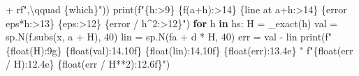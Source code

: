 \documentclass[
  letterpaper,
  DIV=11,
  numbers=noendperiod]{scrreprt}
\newenvironment{Shaded}{\begin{snugshade}}{\end{snugshade}}
\newcommand{\BuiltInTok}[1]{\textcolor[rgb]{0.00,0.23,0.31}{#1}}
\newcommand{\ControlFlowTok}[1]{\textcolor[rgb]{0.00,0.23,0.31}{\textbf{#1}}}
\newcommand{\DecValTok}[1]{\textcolor[rgb]{0.68,0.00,0.00}{#1}}
\newcommand{\ErrorTok}[1]{\textcolor[rgb]{0.68,0.00,0.00}{#1}}
\newcommand{\KeywordTok}[1]{\textcolor[rgb]{0.00,0.23,0.31}{\textbf{#1}}}
\newcommand{\NormalTok}[1]{\textcolor[rgb]{0.00,0.23,0.31}{#1}}
\newcommand{\OperatorTok}[1]{\textcolor[rgb]{0.37,0.37,0.37}{#1}}
\newcommand{\SpecialCharTok}[1]{\textcolor[rgb]{0.37,0.37,0.37}{#1}}
\newcommand{\SpecialStringTok}[1]{\textcolor[rgb]{0.13,0.47,0.30}{#1}}
\newcommand{\StringTok}[1]{\textcolor[rgb]{0.13,0.47,0.30}{#1}}
\newcommand{\VerbatimStringTok}[1]{\textcolor[rgb]{0.13,0.47,0.30}{#1}}
\theoremstyle{plain}
\theoremstyle{plain}
\theoremstyle{definition}
\theoremstyle{definition}
\theoremstyle{definition}
\theoremstyle{plain}
\theoremstyle{plain}
\theoremstyle{remark}
\begin{document}
\begin{Shaded}
\begin{Highlighting}[]
                 \OperatorTok{+} \VerbatimStringTok{rf",}\ErrorTok{\textbackslash{}}\VerbatimStringTok{qquad }\SpecialCharTok{\{}\NormalTok{which}\SpecialCharTok{\}}\VerbatimStringTok{"}\NormalTok{))}
    \BuiltInTok{print}\NormalTok{(}\SpecialStringTok{f"}\SpecialCharTok{\{}\StringTok{\textquotesingle{}h\textquotesingle{}}\SpecialCharTok{:\textgreater{}9\}}\SpecialStringTok{ }\SpecialCharTok{\{}\StringTok{\textquotesingle{}f(a+h)\textquotesingle{}}\SpecialCharTok{:\textgreater{}14\}}\SpecialStringTok{ }\SpecialCharTok{\{}\StringTok{\textquotesingle{}line at a+h\textquotesingle{}}\SpecialCharTok{:\textgreater{}14\}}\SpecialStringTok{ }\SpecialCharTok{\{}\StringTok{\textquotesingle{}error eps*h\textquotesingle{}}\SpecialCharTok{:\textgreater{}13\}}\SpecialStringTok{ }\SpecialCharTok{\{}\StringTok{\textquotesingle{}eps\textquotesingle{}}\SpecialCharTok{:\textgreater{}12\}}\SpecialStringTok{ }\SpecialCharTok{\{}\StringTok{\textquotesingle{}error / h\^{}2\textquotesingle{}}\SpecialCharTok{:\textgreater{}12\}}\SpecialStringTok{"}\NormalTok{)}
    \ControlFlowTok{for}\NormalTok{ h }\KeywordTok{in}\NormalTok{ hs:}
\NormalTok{        H }\OperatorTok{=}\NormalTok{ \_exact(h)}
\NormalTok{        val }\OperatorTok{=}\NormalTok{ sp.N(f.subs(x, a }\OperatorTok{+}\NormalTok{ H), }\DecValTok{40}\NormalTok{)}
\NormalTok{        lin }\OperatorTok{=}\NormalTok{ sp.N(fa }\OperatorTok{+}\NormalTok{ d }\OperatorTok{*}\NormalTok{ H, }\DecValTok{40}\NormalTok{)}
\NormalTok{        err }\OperatorTok{=}\NormalTok{ val }\OperatorTok{{-}}\NormalTok{ lin}
        \BuiltInTok{print}\NormalTok{(}\SpecialStringTok{f"}\SpecialCharTok{\{}\BuiltInTok{float}\NormalTok{(H)}\SpecialCharTok{:9g\}}\SpecialStringTok{ }\SpecialCharTok{\{}\BuiltInTok{float}\NormalTok{(val)}\SpecialCharTok{:14.10f\}}\SpecialStringTok{ }\SpecialCharTok{\{}\BuiltInTok{float}\NormalTok{(lin)}\SpecialCharTok{:14.10f\}}\SpecialStringTok{ }\SpecialCharTok{\{}\BuiltInTok{float}\NormalTok{(err)}\SpecialCharTok{:13.4e\}}\SpecialStringTok{ "}
              \SpecialStringTok{f"}\SpecialCharTok{\{}\BuiltInTok{float}\NormalTok{(err }\OperatorTok{/}\NormalTok{ H)}\SpecialCharTok{:12.4e\}}\SpecialStringTok{ }\SpecialCharTok{\{}\BuiltInTok{float}\NormalTok{(err }\OperatorTok{/}\NormalTok{ H}\OperatorTok{**}\DecValTok{2}\NormalTok{)}\SpecialCharTok{:12.6f\}}\SpecialStringTok{"}\NormalTok{)}



\end{Highlighting}
\end{Shaded}
\end{document}
